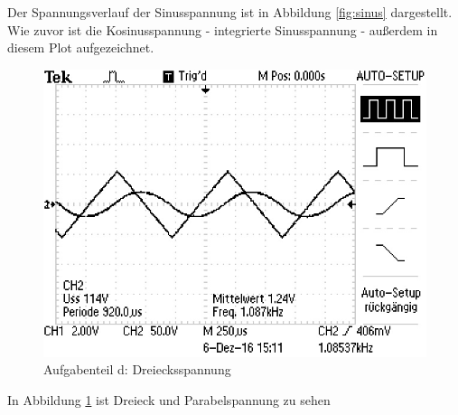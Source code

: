 Der Spannungsverlauf der Sinusspannung ist in Abbildung \ref{fig:sinus} dargestellt. Wie zuvor ist die Kosinusspannung - integrierte Sinusspannung - außerdem in diesem Plot aufgezeichnet.


\begin{figure}
	\centering
	\includegraphics[angle=90]{bilder/ALL0003/F0003TEK.JPG}
	\caption{Aufgabenteil d: Dreiecksspannung}
	\label{fig:dreieck}
\end{figure}

In Abbildung \ref{fig:dreieck} ist Dreieck und Parabelspannung zu sehen
